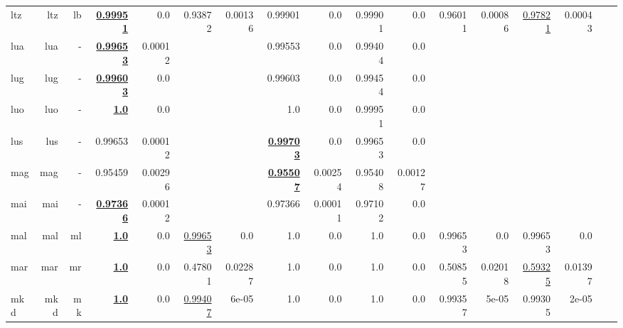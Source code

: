 \documentclass[11pt]{article}
\begin{document}
\begin{table*}[h]
{\begin{tabular}{lrrrrrrrrrrrrrrrr}
ltz         & ltz         & lb         & \textbf{\underline{0.99951}}         & 0.0         & 0.93872         & 0.00136         & 0.99901         & 0.0         & 0.99901         & 0.0         & 0.96011         & 0.00086         & \underline{0.97821}         & 0.00043         \\
lua         & lua         & -         & \textbf{\underline{0.99653}}         & 0.00012         &          &          & 0.99553         & 0.0         & 0.99404         & 0.0         &          &          &          &          \\
lug         & lug         & -         & \textbf{\underline{0.99603}}         & 0.0         &          &          & 0.99603         & 0.0         & 0.99454         & 0.0         &          &          &          &          \\
luo         & luo         & -         & \textbf{\underline{1.0}}         & 0.0         &          &          & 1.0         & 0.0         & 0.99951         & 0.0         &          &          &          &          \\
lus         & lus         & -         & 0.99653         & 0.00012         &          &          & \textbf{\underline{0.99703}}         & 0.0         & 0.99653         & 0.0         &          &          &          &          \\
mag         & mag         & -         & 0.95459         & 0.00296         &          &          & \textbf{\underline{0.95507}}         & 0.00254         & 0.95408         & 0.00127         &          &          &          &          \\
mai         & mai         & -         & \textbf{\underline{0.97366}}         & 0.00012         &          &          & 0.97366         & 0.00011         & 0.97102         & 0.0         &          &          &          &          \\
mal         & mal         & ml         & \textbf{\underline{1.0}}         & 0.0         & \underline{0.99653}         & 0.0         & 1.0         & 0.0         & 1.0         & 0.0         & 0.99653         & 0.0         & 0.99653         & 0.0         \\
mar         & mar         & mr         & \textbf{\underline{1.0}}         & 0.0         & 0.47801         & 0.02287         & 1.0         & 0.0         & 1.0         & 0.0         & 0.50855         & 0.02018         & \underline{0.59325}         & 0.01397         \\
mkd         & mkd         & mk         & \textbf{\underline{1.0}}         & 0.0         & \underline{0.99407}         & 6e-05         & 1.0         & 0.0         & 1.0         & 0.0         & 0.99357         & 5e-05         & 0.99305         & 2e-05         \\

\end{tabular}}
\end{table*}
\end{document}
